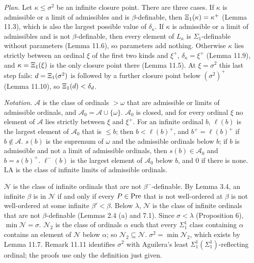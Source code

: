 \documentclass[11pt]{article}
\begin{document}
\emph{Plan.} Let $\kappa \le \sigma^2$ be an infinite closure point. There are three cases. If $\kappa$ is
admissible or a limit of admissibles and is $\beta$-definable, then $\Xi_1(\kappa) = \kappa^+$ (Lemma 11.3), which
is also the largest possible value of $\delta_{\kappa}$. If $\kappa$ is admissible or a limit of admissibles and
is not $\beta$-definable, then every element of $L_{\kappa}$ is $\Sigma_1$-definable without parameters (Lemma
11.6), so parameters add nothing. Otherwise $\kappa$ lies strictly between an ordinal $\xi$ of the first two kinds
and $\xi^+$, $\delta_{\kappa} = \xi^+$ (Lemma 11.9), and $\kappa = \Xi_1(\xi)$ is the only closure point there
(Lemma 11.5). At $\xi = \sigma^2$ this last step fails: $d = \Xi_1(\sigma^2)$ is followed by a further closure point
below $(\sigma^2)^+$ (Lemma 11.10), so $\Xi_1(d) < \delta_d$.

\emph{Notation.} $\mathcal A$ is the class of ordinals $> \omega$ that are admissible or limits of admissible
ordinals, and $\mathcal A_0 = \mathcal A \cup \{\omega\}$. $\mathcal A_0$ is closed, and for every ordinal $\xi$ no
element of $\mathcal A$ lies strictly between $\xi$ and $\xi^+$. For an infinite ordinal $b$, $\ell(b)$ is the largest element of
$\mathcal A_0$ that is $\le b$; then $b < \ell(b)^+$, and $b^+ = \ell(b)^+$ if $b \notin \mathcal A$. $s(b)$ is the
supremum of $\omega$ and the admissible ordinals below $b$; if $b$ is admissible and not a limit of admissible
ordinals, then $s(b) \in \mathcal A_0$ and $b = s(b)^+$. $\ell^-(b)$ is the largest element of $\mathcal A_0$ below
$b$, and $0$ if there is none. $\mathrm{LA}$ is the class of infinite limits of admissible ordinals.

$\mathcal N$ is the class of infinite ordinals that are not $\beta^-$-definable. By Lemma 3.4, an infinite $\beta$
is in $\mathcal N$ if and only if every $P \in \mathrm{Pre}$ that is not well-ordered at $\beta$ is not well-ordered at
some infinite $\beta' < \beta$. Below $\lambda$, $\mathcal N$ is the class of infinite ordinals that are not
$\beta$-definable (Lemmas 2.4 (a) and 7.1). Since $\sigma < \lambda$ (Proposition 6), $\min \mathcal N = \sigma$.
$\mathcal N_2$ is the class of ordinals $\alpha$ such that every $\Sigma^1_1$ class containing $\alpha$ contains
an element of $\mathcal N$ below $\alpha$; so $\mathcal N_2 \subseteq \mathcal N$. $\sigma^2 = \min \mathcal N_2$,
which exists by Lemma 11.7. Remark 11.11 identifies $\sigma^2$ with Aguilera's least
$\Sigma^1_1(\Sigma^1_1)$-reflecting ordinal; the proofs use only the definition just given.
\end{document}
